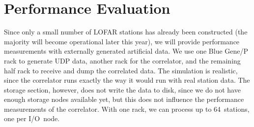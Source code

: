 \documentclass{sig-alternate}
\begin{document}



%



\section{Performance Evaluation}
\label{sec:performance}

Since only a small number of LOFAR stations has already been constructed
(the majority will become operational later this year), we will provide 
performance measurements with externally generated artificial data.
We use one Blue Gene/P rack to generate UDP data, another rack for the
correlator, and the remaining half rack to receive and dump the correlated
data.
The simulation is realistic, since the correlator runs exactly
the way it would run with real station data.
The storage section, however, does not write the data to disk, since we do
not have enough storage nodes available yet, but this does not influence the
performance measurements of the correlator.
With one rack, we can process up to 64~stations, one per I/O~node.
\end{document}
